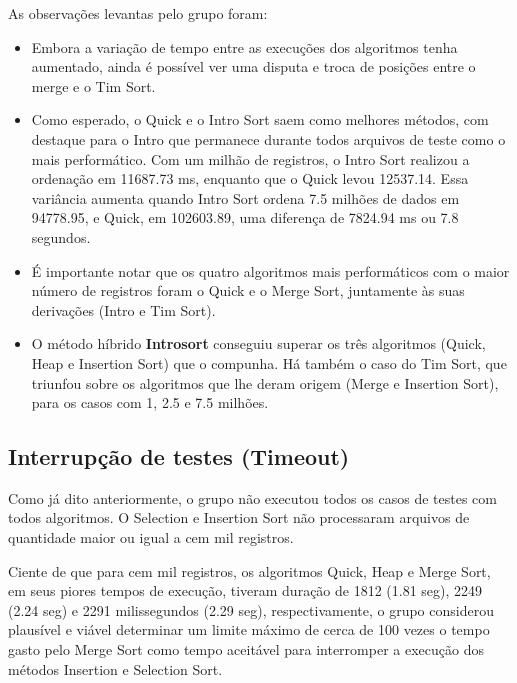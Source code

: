 \documentclass[a4paper,12pt]{scrartcl}
\begin{document}
As observações levantas pelo grupo foram:
\begin{itemize}
    \item
    Embora a variação de tempo entre as execuções dos algoritmos tenha aumentado, ainda é possível ver uma disputa e troca de posições entre o merge e o Tim Sort.

    \item
    Como esperado, o Quick e o Intro Sort saem como melhores métodos, com destaque para o Intro que permanece durante todos arquivos de teste como o mais performático. Com um milhão de registros, o Intro Sort realizou a ordenação em 11687.73 ms, enquanto que o Quick levou 12537.14. Essa variância aumenta quando Intro Sort ordena 7.5 milhões de dados em 94778.95, e Quick, em 102603.89, uma diferença de 7824.94 ms ou 7.8 segundos.
    
    \item É importante notar que os quatro algoritmos mais performáticos com o maior número de registros foram o Quick e o Merge Sort, juntamente às suas derivações (Intro e Tim Sort).
    
    \item
    O método híbrido \textbf{Introsort} conseguiu superar os três algoritmos (Quick, Heap e Insertion Sort) que o compunha. Há também o caso do Tim Sort, que triunfou sobre os algoritmos que lhe deram origem (Merge e Insertion Sort), para os casos com 1, 2.5 e 7.5 milhões.
    
\end{itemize}

\subsection{Interrupção de testes (Timeout)}

Como já dito anteriormente, o grupo não executou todos os casos de testes com todos algoritmos. O Selection e Insertion Sort não processaram arquivos de quantidade maior ou igual a cem mil registros.

Ciente de que para cem mil registros, os algoritmos Quick, Heap e Merge Sort, em seus piores tempos de execução, tiveram duração de 1812 (1.81 seg), 2249 (2.24 seg) e 2291 milissegundos (2.29 seg), respectivamente, o grupo considerou plausível e viável determinar um limite máximo de cerca de 100 vezes o tempo gasto pelo Merge Sort como tempo aceitável para interromper a execução dos métodos Insertion e Selection Sort.
\end{document}
